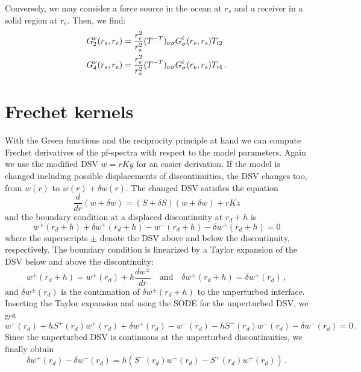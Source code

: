 \documentclass[11pt,a4paper]{article}
\begin{document}
Conversely, we may consider a force source in the ocean at $r_s$ and a receiver in a solid region at $r_e$. Then, we find:
\begin{align}
G_{2}^\nu(r_s,r_e) &= \frac{r_e^2}{r_s^2} (T^{-T})_{\nu\sigma} G_\sigma^i(r_e,r_s) T_{i {2}} \notag\\
G_{4}^\nu(r_s,r_e) &= \frac{r_e^2}{r_s^2} (T^{-T})_{\nu\sigma} G_\sigma^i(r_e,r_s) T_{i {4}}\,.
\end{align}
 
\section{Frechet kernels}
%
With the Green functions and the reciprocity principle at hand we can compute Frechet derivatives of the pf-spectra with respect to the model parameters. Again we use the modified DSV $w=rKy$ for an easier derivation. If the model is changed including possible displacements of discontinuities, the DSV changes too, from $w(r)$ to $w(r)+\delta w(r)$. The changed DSV satisfies the equation
\begin{equation}
\frac{d}{dr}(w+\delta w)=(S+\delta S)(w+\delta w)+rKz
\end{equation}
and the boundary condition at a displaced discontinuity at $r_d+h$ is
\begin{equation}
w^+(r_d+h)+\delta w^+(r_d+h)-w^-(r_d+h)-\delta w^+(r_d+h) = 0
\end{equation}
where the superscripts $\pm$ denote the DSV above and below the discontinuity, respectively.
The boundary condition is linearized by a Taylor expansion of the DSV below and above the discontinuity:
\begin{equation}
w^\pm(r_d+h)=w^\pm(r_d)+h\frac{dw^\pm}{dr} \quad \mbox{and} \quad \delta w^\pm(r_d+h)=\delta w^\pm(r_d)\,,
\end{equation}
and $\delta w^\pm(r_d)$ is the continuation of $\delta w^\pm(r_d+h)$ to the unperturbed interface. 
Inserting the Taylor expansion and using the SODE for the unperturbed DSV, we get
\begin{equation}
w^+(r_d)+hS^+(r_d)w^+(r_d)+\delta w^+(r_d)-w^-(r_d)-hS^-(r_d)w^-(r_d) -\delta w^-(r_d)=0 \,.
\end{equation}
Since the unperturbed DSV is continuous at the unperturbed discontinuities, we finally obtain
\begin{equation}
\delta w^+(r_d)-\delta w^-(r_d)=h(S^-(r_d)w^-(r_d)-S^+(r_d)w^+(r_d)) \,.
\end{equation}
\end{document}
